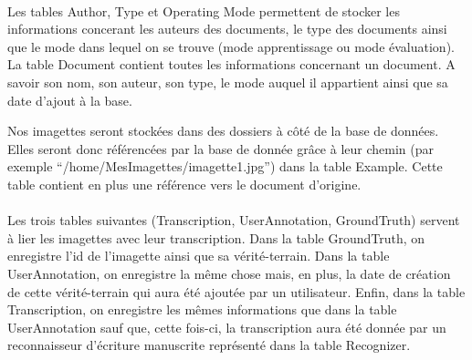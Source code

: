 \paragraph{}

Les tables Author, Type et Operating Mode permettent de stocker les informations concerant les auteurs des documents, le type des documents ainsi que le mode dans lequel on se trouve (mode apprentissage ou mode évaluation).
La table Document contient toutes les informations concernant un document. A savoir son nom, son auteur, son type, le mode auquel il appartient ainsi que sa date d’ajout à la base.

Nos imagettes seront stockées dans des dossiers à côté de la base de données. Elles seront donc référencées par la base de donnée grâce à leur chemin (par exemple “/home/MesImagettes/imagette1.jpg”) dans la table Example. Cette table contient en plus une référence vers le document d’origine.

\paragraph{}

Les trois tables suivantes (Transcription, UserAnnotation, GroundTruth) servent à lier les imagettes avec leur transcription. Dans la table GroundTruth, on enregistre l’id de l’imagette ainsi que sa vérité-terrain. Dans la table UserAnnotation, on enregistre la même chose mais, en plus, la date de création de cette vérité-terrain qui aura été ajoutée par un utilisateur. Enfin, dans la table Transcription, on enregistre les mêmes informations que dans la table UserAnnotation sauf que, cette fois-ci, la transcription aura été donnée par un reconnaisseur d’écriture manuscrite représenté dans la table Recognizer.








